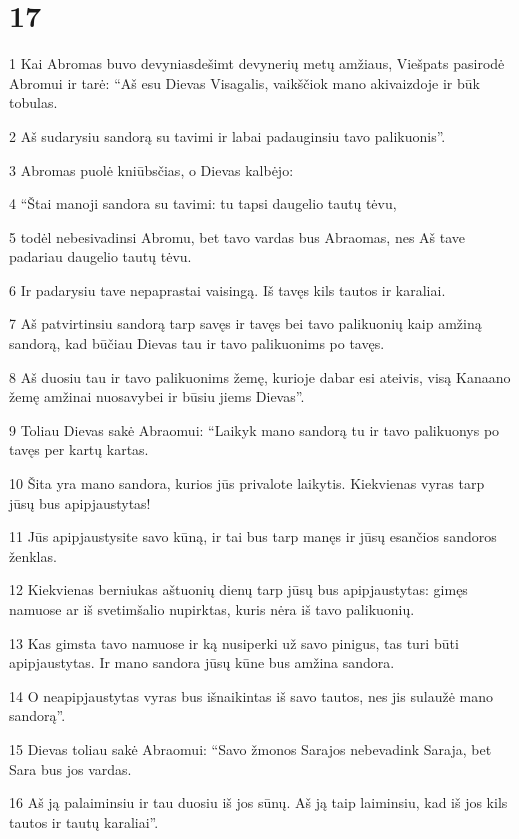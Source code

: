 \chapter{17}

\par 1 Kai Abromas buvo devyniasdešimt devynerių metų amžiaus, Viešpats pasirodė Abromui ir tarė: “Aš esu Dievas Visagalis, vaikščiok mano akivaizdoje ir būk tobulas. 
\par 2 Aš sudarysiu sandorą su tavimi ir labai padauginsiu tavo palikuonis”. 
\par 3 Abromas puolė kniūbsčias, o Dievas kalbėjo: 
\par 4 “Štai manoji sandora su tavimi: tu tapsi daugelio tautų tėvu, 
\par 5 todėl nebesivadinsi Abromu, bet tavo vardas bus Abraomas, nes Aš tave padariau daugelio tautų tėvu. 
\par 6 Ir padarysiu tave nepaprastai vaisingą. Iš tavęs kils tautos ir karaliai. 
\par 7 Aš patvirtinsiu sandorą tarp savęs ir tavęs bei tavo palikuonių kaip amžiną sandorą, kad būčiau Dievas tau ir tavo palikuonims po tavęs. 
\par 8 Aš duosiu tau ir tavo palikuonims žemę, kurioje dabar esi ateivis, visą Kanaano žemę amžinai nuosavybei ir būsiu jiems Dievas”. 
\par 9 Toliau Dievas sakė Abraomui: “Laikyk mano sandorą tu ir tavo palikuonys po tavęs per kartų kartas. 
\par 10 Šita yra mano sandora, kurios jūs privalote laikytis. Kiekvienas vyras tarp jūsų bus apipjaustytas! 
\par 11 Jūs apipjaustysite savo kūną, ir tai bus tarp manęs ir jūsų esančios sandoros ženklas. 
\par 12 Kiekvienas berniukas aštuonių dienų tarp jūsų bus apipjaustytas: gimęs namuose ar iš svetimšalio nupirktas, kuris nėra iš tavo palikuonių. 
\par 13 Kas gimsta tavo namuose ir ką nusiperki už savo pinigus, tas turi būti apipjaustytas. Ir mano sandora jūsų kūne bus amžina sandora. 
\par 14 O neapipjaustytas vyras bus išnaikintas iš savo tautos, nes jis sulaužė mano sandorą”. 
\par 15 Dievas toliau sakė Abraomui: “Savo žmonos Sarajos nebevadink Saraja, bet Sara bus jos vardas. 
\par 16 Aš ją palaiminsiu ir tau duosiu iš jos sūnų. Aš ją taip laiminsiu, kad iš jos kils tautos ir tautų karaliai”. 
